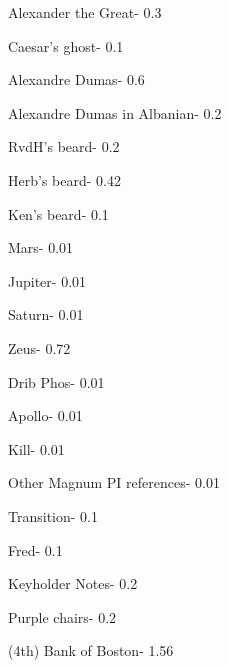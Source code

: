 \documentclass[12pt]{article}
\begin{document}
Alexander the Great- 0.3

Caesar's ghost- 0.1

Alexandre Dumas- 0.6

Alexandre Dumas in Albanian- 0.2

RvdH's beard- 0.2

Herb's beard- 0.42

Ken's beard- 0.1

Mars- 0.01

Jupiter- 0.01

Saturn- 0.01

Zeus- 0.72

Drib Phos- 0.01

Apollo- 0.01

Kill- 0.01

Other Magnum PI references- 0.01

Transition- 0.1

Fred- 0.1

Keyholder Notes- 0.2

Purple chairs- 0.2

(4th) Bank of Boston- 1.56
\end{document}
